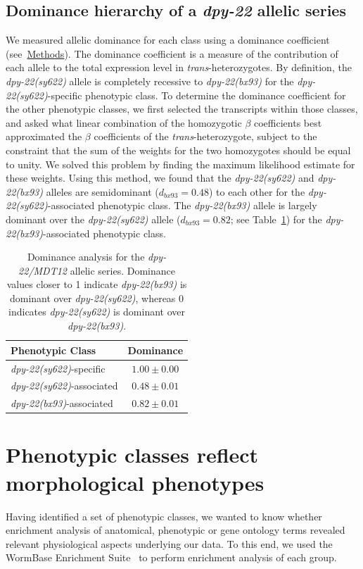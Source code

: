\documentclass[9pt,twocolumn,twoside]{gsajnl}
\newcommand{\gene}[1]{\mbox{\emph{#1}}}
\newcommand{\dpy}[1]{\gene{dpy-22#1}}
\newcommand{\bx}{\dpy{(bx93)}}
\newcommand{\sy}{\dpy{(sy622)}}
\begin{document}
\subsection*{Dominance hierarchy of a \gene{dpy-22} allelic series}
We measured allelic dominance for each class using a dominance coefficient
(see~\hyperref[sec:methods]{Methods}). The dominance coefficient is a measure of
the contribution of each allele to the total expression level in
\emph{trans}-heterozygotes. By definition, the \sy{} allele is completely
recessive to \bx{} for the \sy{}-specific phenotypic class. To determine the
dominance coefficient for the other phenotypic classes, we first selected the
transcripts within those classes, and asked what linear combination of the
homozygotic $\beta$ coefficients best approximated the $\beta$ coefficients of
the \emph{trans}-heterozygote, subject to the constraint that the sum of the
weights for the two homozygotes should be equal to unity. We solved this problem
by finding the maximum likelihood estimate for these weights. Using this method,
we found that the \sy{} and \bx{} alleles are semidominant ($d_{bx93} = 0.48$)
to each other for the \sy{}-associated phenotypic class. The \bx{} allele is
largely  dominant over the \sy{} allele ($d_{bx93}=0.82$; see
Table~\ref{tab:dom}) for the \bx{}-associated phenotypic class.

\begin{table}
  \centering
  \begin{tabular}{lc}
    \toprule
    Phenotypic Class & Dominance\\
    \midrule
    \sy{}-specific & $1.00\pm0.00$\\
    \sy{}-associated & $0.48\pm0.01$\\
    \bx{}-associated & $0.82\pm0.01$\\
    \bottomrule
  \end{tabular}
  \caption{
           Dominance analysis for the \dpy{/MDT12} allelic series. Dominance
           values closer to 1 indicate \bx{} is dominant over \sy{}, whereas 0
           indicates \sy{} is dominant over \bx{}.
          }
\label{tab:dom}
\end{table}

\section*{Phenotypic classes reflect morphological phenotypes}
Having identified a set of phenotypic classes, we wanted to know whether
enrichment analysis of anatomical, phenotypic or gene ontology terms revealed
relevant physiological aspects underlying our data. To this end, we used the
WormBase Enrichment Suite~\citep{Angeles-Albores2018} to perform enrichment
analysis of each group.
\end{document}
